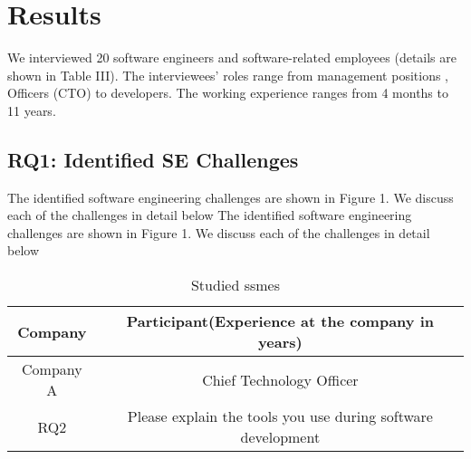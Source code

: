 \documentclass[conference]{IEEEtran}
\begin{document}
\section{Results}

We interviewed 20 software engineers and software-related
employees (details are shown in Table III). The interviewees’
roles range from management positions , Officers (CTO) to developers. The working experience
ranges from 4 months to 11 years.

\subsection{RQ1: Identified SE Challenges}The identified software engineering challenges are shown in
Figure 1. We discuss each of the challenges in detail below
The identified software engineering challenges are shown in
Figure 1. We discuss each of the challenges in detail below
\begin{table}[htpb]
\caption{Studied ssmes}

\begin{tabular}{c c}
\hline 
Company & Participant(Experience at the company in years)\\
\hline  
Company A & Chief Technology Officer \\[0.5ex]
\hline
RQ2 & Please explain the tools you use during software development\\
\hline
\end{tabular}
\end{table}
\end{document}
